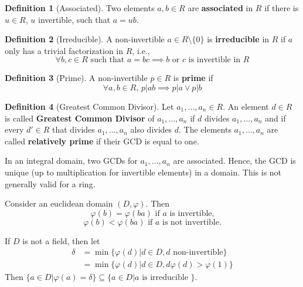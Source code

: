 \documentclass[12pt,a4paper]{article}
\theoremstyle{definition}
\newtheorem{definition}{Definition}[section]
\begin{document}
\begin{definition}[Associated]
Two elements $a,b \in R$ are \textbf{associated} in $R$ if there is $u \in R$, $u$ invertible, such that $a = ub$.
\end{definition}

\begin{definition}[Irreducible]
A non-invertible $a \in R \setminus \{ 0 \}$ is \textbf{irreducible} in $R$ if $a$ only has a trivial factorization in $R$, i.e.,
\[
\forall b, c \in R \text{ such that } a = bc \implies b \text{ or } c \text{ is invertible in } R
\]
\end{definition}

\begin{definition}[Prime]
A non-invertible $p \in R$ is \textbf{prime} if
\[
\forall a, b \in R, \, p|ab \implies p|a \lor p|b
\]
\end{definition}

\begin{definition}[Greatest Common Divisor]
Let $a_1, \ldots, a_n \in R$. An element $d \in R$ is called \textbf{Greatest Common Divisor} of $a_1, \ldots, a_n$ if $d$ divides $a_1, \ldots, a_n$ and if every $d' \in R$ that divides $a_1, \ldots, a_n$ also divides $d$. The elements $a_1, \ldots, a_n$ are called \textbf{relatively prime} if their GCD is equal to one.
\end{definition}

In an integral domain, two GCDs for $a_1, \ldots, a_n$ are associated. Hence, the GCD is unique (up to multiplication for invertible elements) in a domain. This is not generally valid for a ring.

Consider an euclidean domain $(D, \varphi)$. Then 
\[
\varphi (b) = \varphi (ba) \text{ if $a$ is invertible,}
\]
\[
\varphi (b) < \varphi (ba) \text{ if $a$ is not invertible.}
\]

If $D$ is not a field, then let
\begin{equation*}
\begin{aligned}
\delta & = \min \{ \varphi (d) | d \in D, d \text{ non-invertible} \} \\
& = \min \{ \varphi (d) | d \in D, d \varphi (d) > \varphi (1) \}
\end{aligned}
\end{equation*}
Then $\{ a \in D | \varphi (a) = \delta \} \subseteq \{ a \in D | a \text{ is irreducible } \}$.
\end{document}
